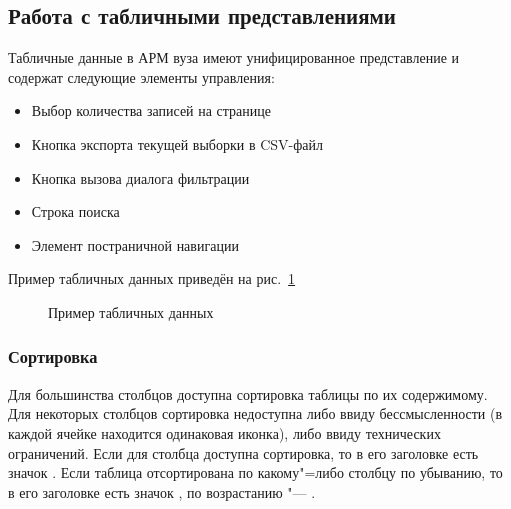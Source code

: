 \graphicspath{ {images/datatables/} }
\subsection{Работа с табличными представлениями} \label{sec:datatables}

Табличные данные в АРМ вуза имеют унифицированное представление и содержат следующие элементы управления:
\begin{itemize}
	\item Выбор количества записей на странице 
	\item Кнопка экспорта текущей выборки в CSV-файл 
	\item Кнопка вызова диалога фильтрации 
	\item Строка поиска 
	\item Элемент постраничной навигации 
\end{itemize}

Пример табличных данных приведён на рис.~\ref{img:datatables:dt}

\begin{figure}[H]
	\caption{Пример табличных данных}
	\label{img:datatables:dt}
\end{figure}

\subsubsection{Сортировка}

Для большинства столбцов доступна сортировка таблицы по их содержимому. Для некоторых столбцов сортировка недоступна
либо ввиду бессмысленности (в каждой ячейке находится одинаковая иконка), либо ввиду технических ограничений.
Если для столбца доступна сортировка, то в его заголовке есть значок .
Если таблица отсортирована по какому"=либо столбцу по убыванию, то в его заголовке есть значок ,
по возрастанию "--- .

